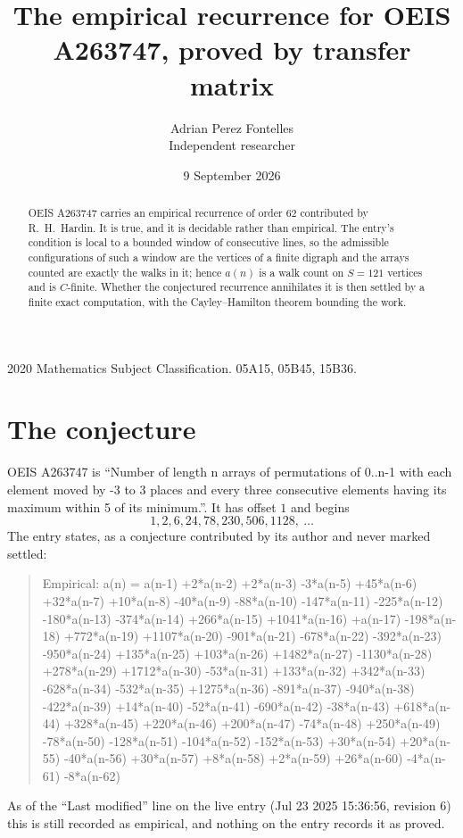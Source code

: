 \documentclass[11pt,a4paper]{article}
\title{The empirical recurrence for OEIS A263747, proved by transfer matrix}
\author{Adrian Perez Fontelles\\ \small Independent researcher}
\date{9 September 2026}
\theoremstyle{plain}
\theoremstyle{definition}
\begin{document}
\maketitle

\begin{abstract}
OEIS A263747 carries an empirical recurrence of order $62$ contributed by R.~H.~Hardin. It is
true, and it is decidable rather than empirical. The entry's condition is local to a bounded window of consecutive lines, so
the admissible configurations of such a window are the vertices of a finite digraph and the
arrays counted are exactly the walks in it; hence $a(n)$ is a walk count on $S=121$ vertices
and is $C$-finite. Whether the conjectured recurrence annihilates it is then settled by a
finite exact computation, with the Cayley--Hamilton theorem bounding the work.
\end{abstract}

\noindent\small 2020 Mathematics Subject Classification. 05A15, 05B45, 15B36.\normalsize

\section{The conjecture}

OEIS A263747 is ``Number of length n arrays of permutations of 0..n-1 with each element moved by -3 to 3 places and every three consecutive elements having its maximum within 5 of its minimum.''. It has offset $1$ and begins
\[
1, 2, 6, 24, 78, 230, 506, 1128,\ \dots
\]
The entry states, as a conjecture contributed by its author and never marked settled:
\begin{quote}
Empirical: a(n) = a(n-1) +2*a(n-2) +2*a(n-3) -3*a(n-5) +45*a(n-6) +32*a(n-7) +10*a(n-8) -40*a(n-9) -88*a(n-10) -147*a(n-11) -225*a(n-12) -180*a(n-13) -374*a(n-14) +266*a(n-15) +1041*a(n-16) +a(n-17) -198*a(n-18) +772*a(n-19) +1107*a(n-20) -901*a(n-21) -678*a(n-22) -392*a(n-23) -950*a(n-24) +135*a(n-25) +103*a(n-26) +1482*a(n-27) -1130*a(n-28) +278*a(n-29) +1712*a(n-30) -53*a(n-31) +133*a(n-32) +342*a(n-33) -628*a(n-34) -532*a(n-35) +1275*a(n-36) -891*a(n-37) -940*a(n-38) -422*a(n-39) +14*a(n-40) -52*a(n-41) -690*a(n-42) -38*a(n-43) +618*a(n-44) +328*a(n-45) +220*a(n-46) +200*a(n-47) -74*a(n-48) +250*a(n-49) -78*a(n-50) -128*a(n-51) -104*a(n-52) -152*a(n-53) +30*a(n-54) +20*a(n-55) -40*a(n-56) +30*a(n-57) +8*a(n-58) +2*a(n-59) +26*a(n-60) -4*a(n-61) -8*a(n-62)
\end{quote}
As of the ``Last modified'' line on the live entry (Jul 23 2025 15:36:56, revision 6) this is still
recorded as empirical, and nothing on the entry records it as proved.
\end{document}
